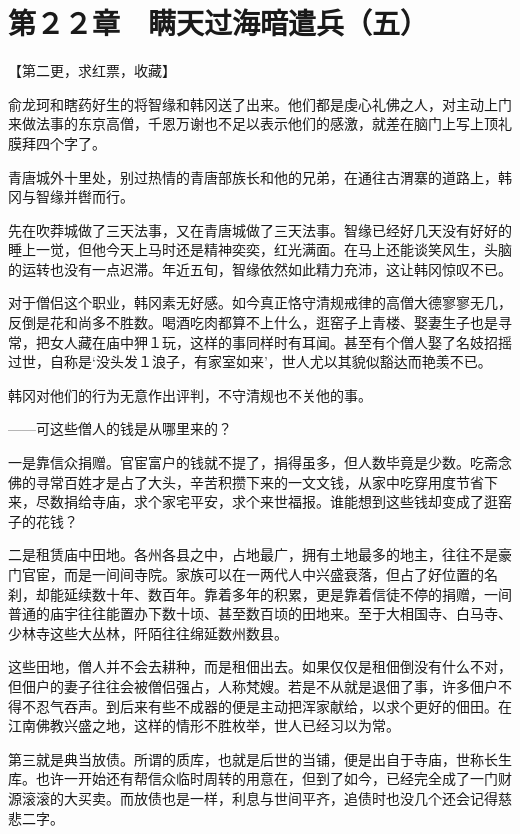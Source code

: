\section{第２２章　瞒天过海暗遣兵（五）}

【第二更，求红票，收藏】

俞龙珂和瞎药好生的将智缘和韩冈送了出来。他们都是虔心礼佛之人，对主动上门来做法事的东京高僧，千恩万谢也不足以表示他们的感激，就差在脑门上写上顶礼膜拜四个字了。

青唐城外十里处，别过热情的青唐部族长和他的兄弟，在通往古渭寨的道路上，韩冈与智缘并辔而行。

先在吹莽城做了三天法事，又在青唐城做了三天法事。智缘已经好几天没有好好的睡上一觉，但他今天上马时还是精神奕奕，红光满面。在马上还能谈笑风生，头脑的运转也没有一点迟滞。年近五旬，智缘依然如此精力充沛，这让韩冈惊叹不已。

对于僧侣这个职业，韩冈素无好感。如今真正恪守清规戒律的高僧大德寥寥无几，反倒是花和尚多不胜数。喝酒吃肉都算不上什么，逛窑子上青楼、娶妻生子也是寻常，把女人藏在庙中狎１玩，这样的事同样时有耳闻。甚至有个僧人娶了名妓招摇过世，自称是‘没头发１浪子，有家室如来’，世人尤以其貌似豁达而艳羡不已。

韩冈对他们的行为无意作出评判，不守清规也不关他的事。

——可这些僧人的钱是从哪里来的？

一是靠信众捐赠。官宦富户的钱就不提了，捐得虽多，但人数毕竟是少数。吃斋念佛的寻常百姓才是占了大头，辛苦积攒下来的一文文钱，从家中吃穿用度节省下来，尽数捐给寺庙，求个家宅平安，求个来世福报。谁能想到这些钱却变成了逛窑子的花钱？

二是租赁庙中田地。各州各县之中，占地最广，拥有土地最多的地主，往往不是豪门官宦，而是一间间寺院。家族可以在一两代人中兴盛衰落，但占了好位置的名刹，却能延续数十年、数百年。靠着多年的积累，更是靠着信徒不停的捐赠，一间普通的庙宇往往能置办下数十顷、甚至数百顷的田地来。至于大相国寺、白马寺、少林寺这些大丛林，阡陌往往绵延数州数县。

这些田地，僧人并不会去耕种，而是租佃出去。如果仅仅是租佃倒没有什么不对，但佃户的妻子往往会被僧侣强占，人称梵嫂。若是不从就是退佃了事，许多佃户不得不忍气吞声。到后来有些不成器的便是主动把浑家献给，以求个更好的佃田。在江南佛教兴盛之地，这样的情形不胜枚举，世人已经习以为常。

第三就是典当放债。所谓的质库，也就是后世的当铺，便是出自于寺庙，世称长生库。也许一开始还有帮信众临时周转的用意在，但到了如今，已经完全成了一门财源滚滚的大买卖。而放债也是一样，利息与世间平齐，追债时也没几个还会记得慈悲二字。

